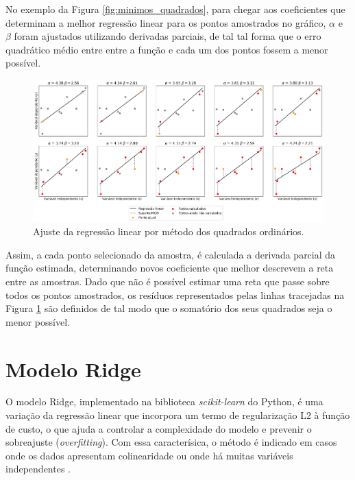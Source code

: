 No exemplo da Figura \ref{fig:minimos_quadrados}, para chegar aos coeficientes que determinam a melhor regressão linear para os pontos amostrados no gráfico, $\alpha$ e $\beta$ foram ajustados utilizando derivadas parciais, de tal tal forma que o erro quadrático médio entre entre a função e cada um dos pontos fossem a menor possível.

\begin{figure}[htb]
	\caption{\label{fig:ajuste_regressao_linear}Ajuste da regressão linear por método dos quadrados ordinários.}
	\begin{center}
		\includegraphics[scale=0.35]{figuras/ols-steps.png}
	\end{center}
\end{figure}

Assim, a cada ponto selecionado da amostra, é calculada a derivada parcial da função estimada, determinando novos coeficiente que melhor descrevem a reta entre as amostras. Dado que não é possível estimar uma reta que passe sobre todos os pontos amostrados, os resíduos representados pelas linhas tracejadas na Figura \ref{fig:ajuste_regressao_linear} são definidos de tal modo que o somatório dos seus quadrados seja o menor possível.

\section{Modelo Ridge}

O modelo Ridge, implementado na biblioteca \textit{scikit-learn} do Python, é uma variação da regressão linear que incorpora um termo de regularização L2 à função de custo, o que ajuda a controlar a complexidade do modelo e prevenir o sobreajuste (\textit{overfitting}). Com essa caracterísica, o método é indicado em casos onde os dados apresentam colinearidade ou onde há muitas variáveis independentes \cite{Jolly2018}.

